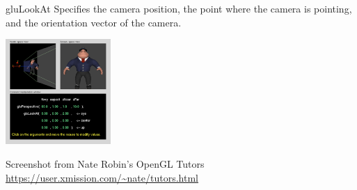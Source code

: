 \documentclass[aspectratio=1610,xcolor=dvipsnames,t]{beamer}
\newcommand{\showcode}[1]{\begin{mdframed}[style=code] %
                          \end{mdframed}%
}
\begin{document}
\begin{frame}{gluLookAt}
    Specifies the camera position, the point where the camera is pointing, 
    and the orientation vector of the camera.
    \showcode{lookat.c} 
    \begin{center}
        \includegraphics[width=0.3\textwidth]{lookat} 
    \end{center} 
    \tiny
    Screenshot from Nate Robin's OpenGL Tutors
    \url{https://user.xmission.com/~nate/tutors.html}
    \normalsize
\end{frame} 
\end{document}
